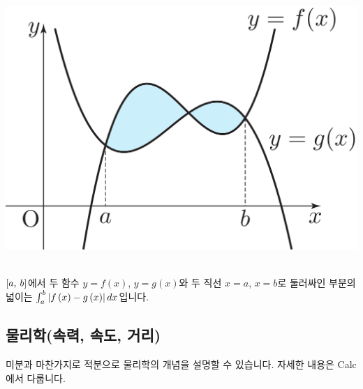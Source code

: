\begin{center}
    \centering \includegraphics[scale=\pgfkeysvalueof{picsize}]{DBs/pic/zerr_13.pdf}\
    \end{center}    
    $\left[a,\: b\right]$에서 두 함수 $y=f\left( x \right) $, $y=g\left( x \right) $와 두 직선 $x=a$, $x=b$로 둘러싸인 부분의 넓이는 $\int_{a}^{b}\left|f\left( x \right)-g\left( x \right)  \right|dx$입니다.


\subsection{물리학(속력, 속도, 거리)}
미분과 마찬가지로 적분으로 물리학의 개념을 설명할 수 있습니다. 자세한 내용은 Calc에서 다룹니다.

\clearpage















